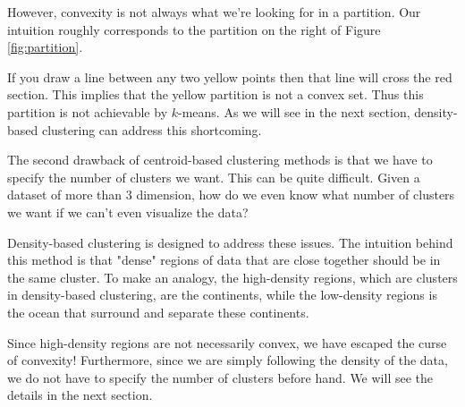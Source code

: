 However, convexity is not always what we're looking for in a partition. Our intuition
roughly corresponds to the partition on the right of  Figure \eqref{fig:partition}.

If you draw a line between any two yellow points then that line will
cross the red section. This implies that the yellow partition is not a convex
set. Thus this partition is not achievable by $k$-means. As we will see
in the next section, density-based clustering can address this shortcoming.

The second drawback of centroid-based clustering methods is that we have
to specify the number of clusters we want. This can be quite difficult. Given
a dataset of more than 3 dimension, how do we even know what number of clusters
we want if we can't even visualize the data?

Density-based clustering is designed to address these issues.
The intuition behind this method is that "dense" regions of data
that are close together should be in the same cluster. To make an analogy,
the high-density regions, which are clusters in density-based clustering, are the continents,
while the low-density regions is the ocean that surround and separate these
continents.

Since high-density regions are not necessarily convex, we have escaped the curse of
convexity! Furthermore, since we are simply following the density of the data,
we do not have to specify the number of clusters before hand. We will see the
details in the next section.
